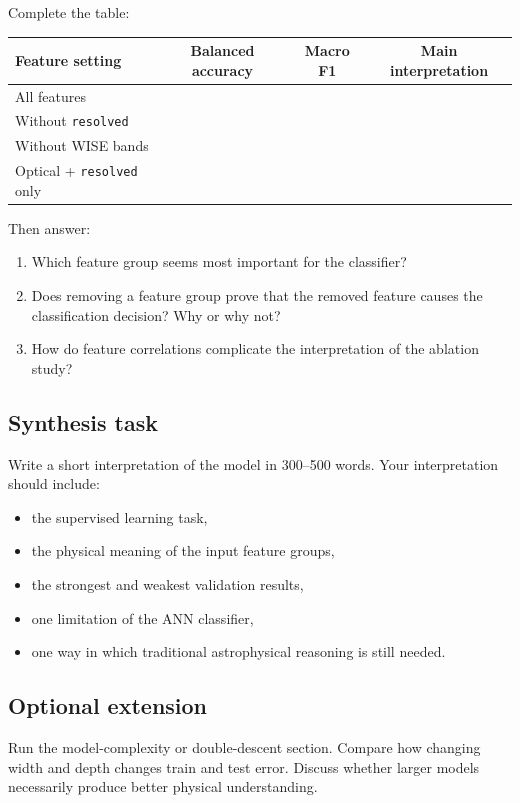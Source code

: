\documentclass[11pt]{article}
\begin{document}
Complete the table:

\begin{center}
\begin{tabular}{l c c c}
\hline
Feature setting & Balanced accuracy & Macro F1 & Main interpretation \\
\hline
All features & & & \\
Without \texttt{resolved} & & & \\
Without WISE bands & & & \\
Optical + \texttt{resolved} only & & & \\
\hline
\end{tabular}
\end{center}

Then answer:
\begin{enumerate}
    \item Which feature group seems most important for the classifier?
    \item Does removing a feature group prove that the removed feature causes the classification decision? Why or why not?
    \item How do feature correlations complicate the interpretation of the ablation study?
\end{enumerate}

\subsection*{Synthesis task}
Write a short interpretation of the model in 300--500 words. Your interpretation should include:
\begin{itemize}
    \item the supervised learning task,
    \item the physical meaning of the input feature groups,
    \item the strongest and weakest validation results,
    \item one limitation of the ANN classifier,
    \item one way in which traditional astrophysical reasoning is still needed.
\end{itemize}

\subsection*{Optional extension}
Run the model-complexity or double-descent section. Compare how changing width and depth changes train and test error. Discuss whether larger models necessarily produce better physical understanding.
\end{document}
